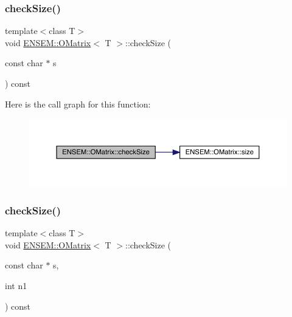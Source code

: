 \subsubsection{\texorpdfstring{checkSize()}{checkSize()}\hspace{0.1cm}{\footnotesize\ttfamily [2/4]}}
{\footnotesize\ttfamily template$<$class T$>$ \\
void \mbox{\hyperlink{classENSEM_1_1OMatrix}{E\+N\+S\+E\+M\+::\+O\+Matrix}}$<$ T $>$\+::check\+Size (\begin{DoxyParamCaption}\item[{const char $\ast$}]{s }\end{DoxyParamCaption}) const\hspace{0.3cm}{\ttfamily [inline]}}

Here is the call graph for this function\+:
\nopagebreak
\begin{figure}[H]
\begin{center}
\leavevmode
\includegraphics[width=350pt]{dd/d80/classENSEM_1_1OMatrix_abec80929ab7e8e2a23822fbbc841bd87_cgraph}
\end{center}
\end{figure}
\mbox{\label{classENSEM_1_1OMatrix_a8e4c3a86b8055f6e67c8fd914b2898ca}} 
\subsubsection{\texorpdfstring{checkSize()}{checkSize()}\hspace{0.1cm}{\footnotesize\ttfamily [3/4]}}
{\footnotesize\ttfamily template$<$class T$>$ \\
void \mbox{\hyperlink{classENSEM_1_1OMatrix}{E\+N\+S\+E\+M\+::\+O\+Matrix}}$<$ T $>$\+::check\+Size (\begin{DoxyParamCaption}\item[{const char $\ast$}]{s,  }\item[{int}]{n1 }\end{DoxyParamCaption}) const\hspace{0.3cm}{\ttfamily [inline]}}

